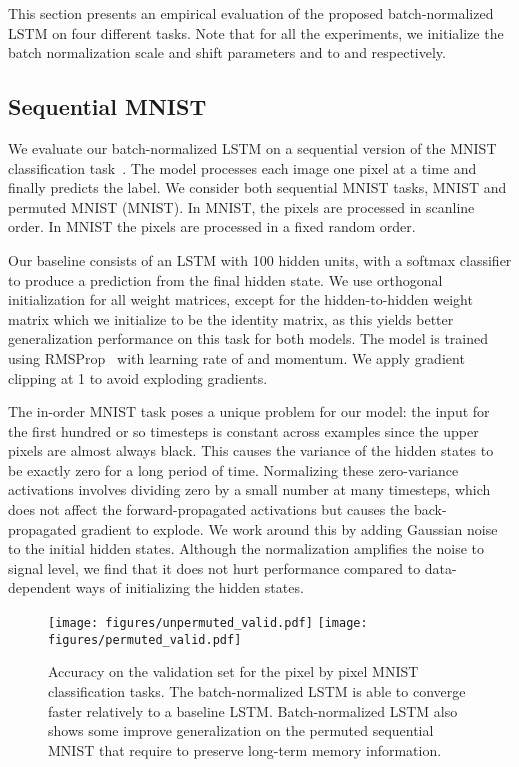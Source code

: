 \documentclass{article} \pdfoutput=1 \usepackage[utf8]{inputenc}
\begin{document}
This section presents an empirical evaluation of the proposed batch-normalized
LSTM on four different tasks.  Note that for all the experiments, we initialize
the batch normalization scale and shift parameters  and  to
 and  respectively.

\subsection{Sequential MNIST}
\label{sec:seqmnist}

We evaluate our batch-normalized LSTM on a sequential version of the MNIST
classification task~\citep{le2015simple}.  The model processes each image one
pixel at a time and finally predicts the label.  We consider both sequential
MNIST tasks, MNIST and permuted MNIST (MNIST).  In MNIST, the pixels are
processed in scanline order.  In MNIST the pixels are processed in a fixed
random order.

Our baseline consists of an LSTM with 100 hidden units, with a softmax
classifier to produce a prediction from the final hidden state.  We use
orthogonal initialization for all weight matrices, except for the
hidden-to-hidden weight matrix which we initialize to be the identity matrix,
as this yields better generalization performance on this task for both models.
The model is trained using RMSProp~\citep{rmsprop} with learning rate of
 and  momentum.  We apply gradient clipping at 1 to avoid
exploding gradients.

The in-order MNIST task poses a unique problem for our model: the input for the
first hundred or so timesteps is constant across examples since the upper
pixels are almost always black.  This causes the variance of the hidden states
to be exactly zero for a long period of time.  Normalizing these zero-variance
activations involves dividing zero by a small number at many timesteps, which
does not affect the forward-propagated activations but causes the
back-propagated gradient to explode.  We work around this by adding Gaussian
noise to the initial hidden states.  Although the normalization amplifies the
noise to signal level, we find that it does not hurt performance compared to
data-dependent ways of initializing the hidden states.


\begin{figure}[!t]
\center
\texttt{[image: figures/unpermuted\_valid.pdf]}
\texttt{[image: figures/permuted\_valid.pdf]}
\caption{Accuracy on the validation set for the pixel by pixel MNIST
classification tasks. The batch-normalized LSTM is able to converge faster
relatively to a baseline LSTM.  Batch-normalized  LSTM also shows some improve
generalization on the permuted sequential MNIST that require to preserve
long-term memory information.}
\label{fig:seqmnist_valid}
\end{figure}
\end{document}
